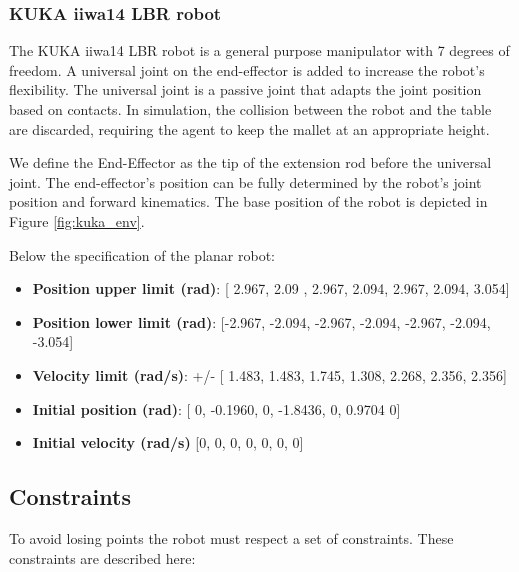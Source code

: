     \subsubsection{KUKA iiwa14 LBR robot}
    The KUKA iiwa14 LBR robot is a general purpose manipulator with 7 degrees of freedom. A universal joint on the end-effector is added
    to increase the robot's flexibility. The universal joint is a passive joint that adapts the joint position based on contacts. In simulation, the collision between the robot and the table
    are discarded, requiring the agent to keep the mallet at an appropriate height.

    We define the End-Effector as the tip of the extension rod before the universal joint. 
    The end-effector's position can be fully determined by the robot's joint position and forward kinematics. 
    The base position of the robot is depicted in Figure \ref{fig:kuka_env}.

    Below the specification of the planar robot:
    \begin{itemize}
        \item \textbf{Position upper limit (rad)}: [ 2.967, 2.09 , 2.967, 2.094, 2.967, 2.094, 3.054]
        \item \textbf{Position lower limit (rad)}: [-2.967, -2.094, -2.967, -2.094, -2.967, -2.094, -3.054]
        \item \textbf{Velocity limit (rad/s)}: +/- [ 1.483, 1.483, 1.745, 1.308, 2.268, 2.356, 2.356]   
        \item \textbf{Initial position (rad)}: [ 0, -0.1960, 0, -1.8436, 0, 0.9704 0]
        \item \textbf{Initial velocity (rad/s)} [0, 0, 0, 0, 0, 0, 0]
    \end{itemize}


\subsection{Constraints}
To avoid losing points the robot must respect a set of constraints.
These constraints are described here:

